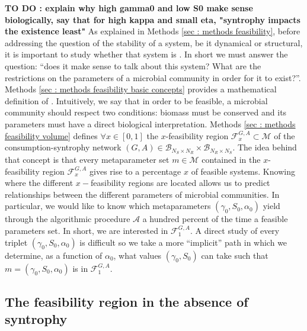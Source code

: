 \documentclass[12pt, titlepage]{report}
\begin{document}
\textbf{TO DO : explain why high gamma0 and low S0 make sense biologically, say that for high kappa and small eta, "syntrophy impacts the existence least"}
As explained in Methods \ref{sec : methods feasibility}, before addressing the question of the stability of a system, be it dynamical or structural, it is important to study whether that system is . In short we must answer the question: ``does it make sense to talk about this system? What are the restrictions on the parameters of a microbial community in order for it to exist?''.
 Methods \ref{sec : methods feasibility basic concepts} provides a mathematical definition of . Intuitively, we say that in order to be feasible, a microbial community should respect two conditions: biomass must be conserved and its parameters must have a direct biological interpretation. Methods \ref{sec : methods feasibility volume} defines $\forall x \in [0,1]$ the $x$-feasibility region $\mathcal{F}^{G,A}_x \subset \mathcal{M}$ of the consumption-syntrophy network $(G, A) \in \mathcal{B}_{N_S \times N_R} \times  \mathcal{B}_{N_R \times N_S}$. The idea behind that concept is that every metaparameter set $m \in \mathcal{M}$ contained in the $x$-feasibility region $\mathcal{F}^{G,A}_x$ gives rise to a percentage $x$ of feasible systems. Knowing where the different $x-$feasibility regions are located allows us to predict relationships between the different parameters of microbial communities. In particular, we would like to know which metaparameters $(\gamma_0, S_0, \alpha_0)$ yield through the algorithmic procedure $\mathcal{A}$ a hundred percent of the time a feasible parameters set. In short, we are interested in $\mathcal{F}^{G,A}_1$. A direct study of every triplet $(\gamma_0, S_0, \alpha_0)$ is difficult so we take a more ``implicit'' path in which we  determine, as a function of $\alpha_0$, what values $(\gamma_0, S_0)$ can take such that $m=(\gamma_0, S_0, \alpha_0)$ is in $\mathcal{F}^{G,A}_1$.


\subsection{The feasibility region in the absence of syntrophy}\label{sec : feasibility without syntrophy}
\end{document}
